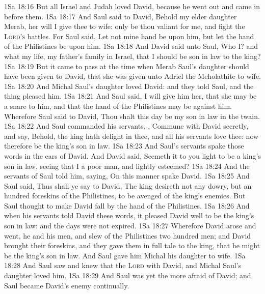 \vs 1Sa 18:16 But all Israel and Judah loved David, because he went out and came in before them.
\vs 1Sa 18:17 And Saul said to David, Behold my elder daughter Merab, her will I give thee to wife: only be thou valiant for me, and fight the \textsc{Lord's} battles. For Saul said, Let not mine hand be upon him, but let the hand of the Philistines be upon him.
\vs 1Sa 18:18 And David said unto Saul, Who  I? and what  my life,  my father's family in Israel, that I should be son in law to the king?
\vs 1Sa 18:19 But it came to pass at the time when Merab Saul's daughter should have been given to David, that she was given unto Adriel the Meholathite to wife.
\vs 1Sa 18:20 And Michal Saul's daughter loved David: and they told Saul, and the thing pleased him.
\vs 1Sa 18:21 And Saul said, I will give him her, that she may be a snare to him, and that the hand of the Philistines may be against him. Wherefore Saul said to David, Thou shalt this day be my son in law in  the twain.
\vs 1Sa 18:22 And Saul commanded his servants, , Commune with David secretly, and say, Behold, the king hath delight in thee, and all his servants love thee: now therefore be the king's son in law.
\vs 1Sa 18:23 And Saul's servants spake those words in the ears of David. And David said, Seemeth it to you  light  to be a king's son in law, seeing that I  a poor man, and lightly esteemed?
\vs 1Sa 18:24 And the servants of Saul told him, saying, On this manner spake David.
\vs 1Sa 18:25 And Saul said, Thus shall ye say to David, The king desireth not any dowry, but an hundred foreskins of the Philistines, to be avenged of the king's enemies. But Saul thought to make David fall by the hand of the Philistines.
\vs 1Sa 18:26 And when his servants told David these words, it pleased David well to be the king's son in law: and the days were not expired.
\vs 1Sa 18:27 Wherefore David arose and went, he and his men, and slew of the Philistines two hundred men; and David brought their foreskins, and they gave them in full tale to the king, that he might be the king's son in law. And Saul gave him Michal his daughter to wife.
\vs 1Sa 18:28 And Saul saw and knew that the \textsc{Lord}  with David, and  Michal Saul's daughter loved him.
\vs 1Sa 18:29 And Saul was yet the more afraid of David; and Saul became David's enemy continually.
